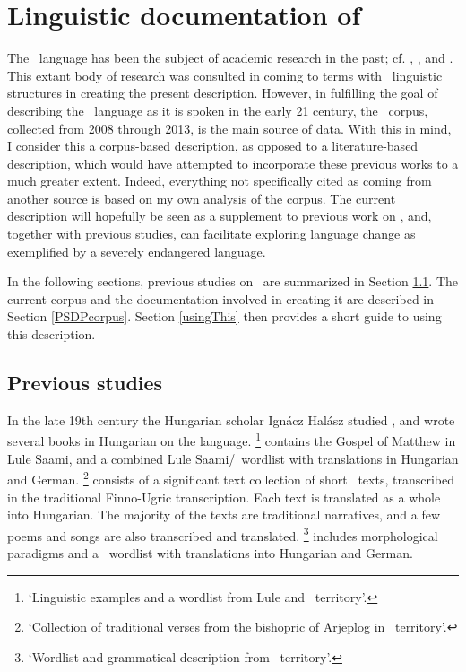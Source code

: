 \FloatBarrier

\section{Linguistic documentation of \PS}\label{lingDoc}
The \PS\ language has been the subject of academic research in the past; cf. \citet{Halasz1896}, \citet{Lagercrantz1926}, \citet{Ruong1943} and \citet{Lehtiranta1992}. %
This extant body of research was consulted in coming to terms with \PS\ linguistic structures in creating the present description. 
However, in fulfilling the goal of describing the \PS\ language as it is spoken in the early 21 century, the \PSDP\ corpus, collected from 2008 through 2013, is the main source of data. With this in mind, I consider this a corpus-based description, as opposed to a literature-based description, which would have attempted to incorporate these previous works to a much greater extent. Indeed, everything not specifically cited as coming from another source is based on my own analysis of the corpus. 
The current description will hopefully be seen as a supplement to previous work on \PS, and, together with previous studies, can facilitate exploring language change as exemplified by a severely endangered language. 

In the following sections, previous studies on \PS\ are summarized in Section \ref{previousWork}. The current corpus and the documentation involved in creating it are described in Section \ref{PSDPcorpus}. Section \ref{usingThis} then provides a short guide to using this description. 

\subsection{Previous studies}\label{previousWork}
In the late 19th century the Hungarian scholar Ignácz Halász studied \PS, and wrote several books in Hungarian on the language. 
\footnote{‘Linguistic examples and a wordlist from Lule and \PS\ territory’.} \citep{Halasz1885} contains the Gospel of Matthew in Lule Saami, and a combined Lule Saami/\PS\ wordlist with translations in Hungarian and German. 
\footnote{‘Collection of traditional verses from the bishopric of Arjeplog in \PS\ territory’.} \citep{Halasz1893} 
consists of a significant text collection of short \PS\ texts, transcribed in the traditional Finno-Ugric transcription. Each text is translated as a whole into Hungarian. The majority of the texts are traditional narratives, %
and a few poems and songs are also transcribed and translated. 
\footnote{‘Wordlist and grammatical description from \PS\ territory’.} \citep{Halasz1896} 
includes morphological paradigms and a \PS\ wordlist with translations into Hungarian and German. 

